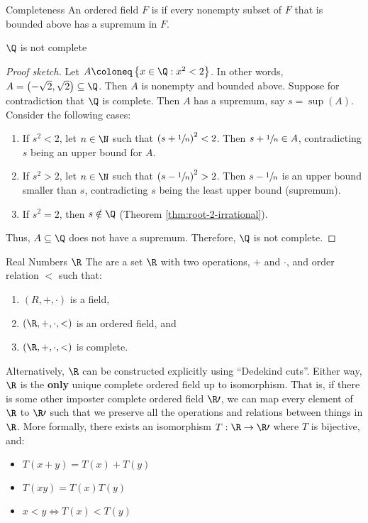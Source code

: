\begin{dfnbox}{Completeness}{}
    An ordered field $F$ is  if every nonempty subset of $F$ that is bounded above has a supremum in $F$.
\end{dfnbox}

\begin{thmbox}{$\Q$ is not complete}{}
    \begin{proof}[Proof sketch]
        Let $A \coloneq \left\{ x \in \Q : x^2 < 2 \right\}$. In other words, $A = \left(-\sqrt{2}, \sqrt{2}\right) \subseteq \Q$. Then $A$ is nonempty and bounded above. Suppose for contradiction that $\Q$ is complete. Then $A$ has a supremum, say $s = \sup(A)$. Consider the following cases:
        \begin{enumerate}
            \item If $s^2 < 2$, let $n \in \N$ such that $\left( s + \sfrac{1}{n} \right)^2 < 2$. Then $s + \sfrac{1}{n} \in A$, contradicting $s$ being an upper bound for $A$.
            \item If $s^2 > 2$, let $n \in \N$ such that $\left( s - \sfrac{1}{n} \right)^2 > 2$. Then $s - \sfrac{1}{n}$ is an upper bound smaller than $s$, contradicting $s$ being the least upper bound (supremum).
            \item If $s^2 = 2$, then $s \notin \Q$ (Theorem \ref{thm:root-2-irrational}).
        \end{enumerate}
        Thus, $A \subseteq \Q$ does not have a supremum. Therefore, $\Q$ is not complete.
    \end{proof}
\end{thmbox}


\begin{dfnbox}{Real Numbers $\R$}{}
    The  are a set $\R$ with two operations, $+$ and $\cdot$, and order relation $<$ such that:
    \begin{enumerate}[noitemsep]
        \item $(R, +, \cdot)$ is a field,
        \item $(\R, +, \cdot, <)$ is an ordered field, and
        \item $(\R, +, \cdot, <)$ is complete.
    \end{enumerate}
\end{dfnbox}

Alternatively, $\R$ can be constructed explicitly using ``Dedekind cuts''. Either way, $\R$ is the \textbf{only} unique complete ordered field up to isomorphism. That is, if there is some other imposter complete ordered field $\R\prime$, we can map every element of $\R$ to $\R\prime$ such that we preserve all the operations and relations between things in $\R$. More formally, there exists an isomorphism $T : \R \to \R\prime$ where $T$ is bijective, and:
\begin{itemize}[noitemsep]
    \item $T(x+y) = T(x) + T(y)$
    \item $T(xy) = T(x)T(y)$
    \item $x < y \iff T(x) < T(y)$
\end{itemize}

